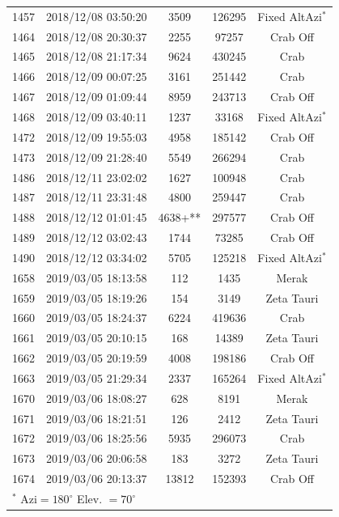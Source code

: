 \begin{table}[ht]
\begin{tabular}{lcccc}
1457 & 2018/12/08 03:50:20  &  3509     & 126295 & Fixed AltAzi$^*$\\ %
1464 & 2018/12/08 20:30:37 &  2255 & 97257 & Crab Off \\ %
1465 & 2018/12/08 21:17:34 &  9624 & 430245 & Crab\\ %
1466 & 2018/12/09 00:07:25 &  3161 & 251442 & Crab \\ %
1467 & 2018/12/09 01:09:44 &  8959 & 243713 & Crab Off \\ %
1468 & 2018/12/09 03:40:11 &  1237 & 33168 &  Fixed AltAzi$^*$\\ %
1472 & 2018/12/09 19:55:03 &  4958 & 185142 &  Crab Off \\ %
1473 & 2018/12/09 21:28:40 &  5549 & 266294 &  Crab\\ %
1486 & 2018/12/11 23:02:02 &  1627 & 100948 &  Crab\\ %
1487 & 2018/12/11 23:31:48 &  4800 & 259447 &  Crab\\ %
1488 & 2018/12/12 01:01:45 &  4638+** & 297577 &  Crab Off\\ %
1489 & 2018/12/12 03:02:43 &  1744 & 73285 &  Crab Off \\ %
1490 & 2018/12/12 03:34:02 &  5705 & 125218 &  Fixed AltAzi$^*$\\ %
1658 & 2019/03/05 18:13:58 &  112 & 1435 & Merak \\  
1659 & 2019/03/05 18:19:26 &  154 & 3149 & Zeta Tauri \\  
1660 & 2019/03/05 18:24:37 &  6224  & 419636 & Crab \\ %
1661 & 2019/03/05 20:10:15 &  168 & 14389 & Zeta Tauri \\  
1662 & 2019/03/05 20:19:59 &  4008 & 198186 & Crab Off \\   
1663 & 2019/03/05 21:29:34 &  2337 & 165264 &  Fixed AltAzi$^*$ \\  
1670 & 2019/03/06 18:08:27 &  628    &   8191      &  Merak\\
1671 & 2019/03/06 18:21:51 &  126        &   2412   & Zeta Tauri \\
1672 & 2019/03/06 18:25:56 &  5935    &   296073   &  Crab \\ %
1673 & 2019/03/06 20:06:58 &  183      &   3272     & Zeta Tauri\\ %
1674 & 2019/03/06 20:13:37 &  13812      &    152393 & Crab Off  \\ %
\hline\hline
\multicolumn{5}{l}{$^*$ Azi$=180^\circ$ Elev. $=70^\circ$}
\end{tabular}
\label{tab:obslog}
\end{table}

